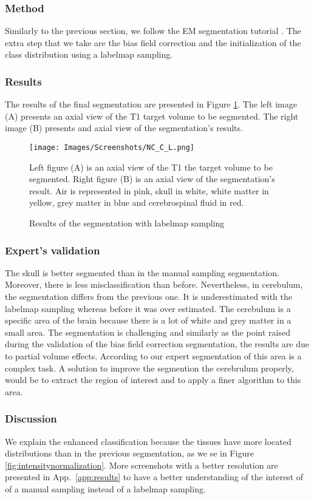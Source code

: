\subsubsection{Method}
Similarly to the previous section, we follow the EM segmentation tutorial . The extra step that we take are the bias field correction and the initialization of the class distribution using a labelmap sampling.
%
\subsubsection{Results}

The results of the final segmentation are presented in Figure \ref{fig:NC_C_L}.  The left image (A) presents an axial view of the T1 target volume to be segmented. The right image (B) presents and axial view of the segmentation's results.

  \begin{figure}\centering
  \texttt{[image: Images/Screenshots/NC\_C\_L.png]}
  \caption{Results of the segmentation with labelmap sampling}{Left figure (A) is an axial view of the T1 the target volume to be segmented. Right figure (B) is an axial view of the segmentation's result. Air is represented in pink, skull in white, white matter in yellow, grey matter in blue and cerebrospinal fluid in red.}\label{fig:NC_C_L}
  \end{figure}
 
%
\subsubsection{Expert's validation}
The skull is better segmented than in the manual sampling segmentation. Moreover, there is less misclassification than before. Nevertheless, in cerebulum, the segmentation differs from the previous one. It is underestimated  with the labelmap sampling whereas before it was over estimated. The cerebulum is a specific area of the brain because there is a lot of white and grey matter in a small area. The segmentation is challenging and similarly as the point raised during the validation of the bias field correction segmentation, the results are due to partial volume effects. According to our expert segmentation of this area is a complex task. A solution to improve the segmention the cerebrulum properly, would be to extract the region of interest and to apply a finer algorithm to this area.

\subsubsection{Discussion}
%
We explain the enhanced classification because the tissues have more located distributions than in the previous segmentation, as we se in Figure \ref{fig:intensitynormalization}. More screenshots with a better resolution are presented in App.~\ref{app:results} to have a better understanding of the interest of of a manual sampling instead of a labelmap sampling.

